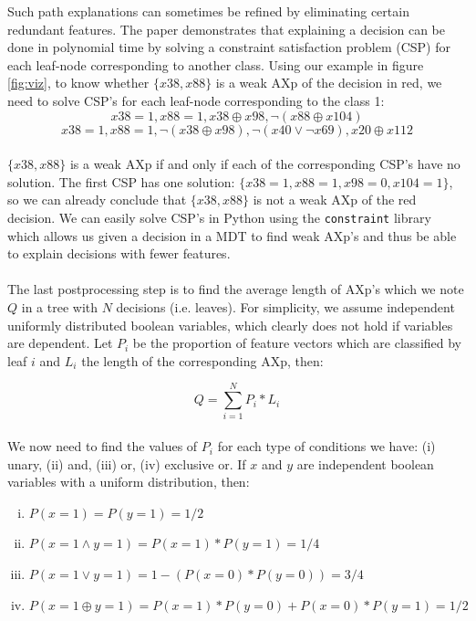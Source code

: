 \documentclass[12pt]{report}
\theoremstyle{definition}
\theoremstyle{definition}
\theoremstyle{definition}
\begin{document}
Such path explanations can sometimes be refined by eliminating certain redundant features. The paper demonstrates that explaining a decision can be done in polynomial time by solving a constraint satisfaction problem (CSP) for each leaf-node corresponding to another class. Using our example in figure \ref{fig:viz}, to know whether $\{x38, x88\}$ is a weak AXp of the decision in red, we need to solve CSP's for each leaf-node corresponding to the class 1:
\[ x38=1, x88=1, x38 \oplus x98, \neg (x88 \oplus x104) \]
\[ x38=1, x88=1, \neg (x38 \oplus x98), \neg (x40 \lor \neg x69), x20 \oplus x112 \]

\newpage

\paragraph{} $\{x38, x88\}$ is a weak AXp if and only if each of the corresponding CSP's have no solution. The first CSP has one solution: $\{x38=1, x88=1, x98=0, x104=1\}$, so we can already conclude that $\{x38, x88\}$ is not a weak AXp of the red decision. We can easily solve CSP's in Python using the \texttt{constraint} library which allows us given a decision in a MDT to find weak AXp's and thus be able to explain decisions with fewer features.

\paragraph{} The last postprocessing step is to find the average length of AXp's which we note $Q$ in a tree with $N$ decisions (i.e. leaves). For simplicity, we assume independent uniformly distributed boolean variables, which clearly does not hold if variables are dependent. Let $P_i$ be the proportion of feature vectors which are classified by leaf $i$ and $L_i$ the length of the corresponding AXp, then:

$$Q = \sum_{i=1}^N P_i * L_i$$

\paragraph{} We now need to find the values of $P_i$ for each type of conditions we have: (i) unary, (ii) and, (iii) or, (iv) exclusive or. If $x$ and $y$ are independent boolean variables with a uniform distribution, then:
\begin{enumerate}[(i)]
    \item $P(x=1) = P(y=1) = 1/2$
    \item $P(x=1 \land y=1) = P(x=1) * P(y=1) = 1/4$
    \item $P(x=1 \lor y=1) = 1 - (P(x=0) * P(y=0)) = 3/4$
    \item $P(x=1 \oplus y=1) = P(x=1) * P(y=0) + P(x=0) * P(y=1) = 1/2$
\end{enumerate}
\end{document}
